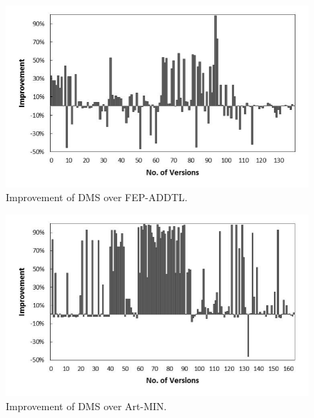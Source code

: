 
\begin{figure}[!htbp]
    \centering
    \includegraphics[width=12cm]{mut-dms-feq.pdf}
\caption{Improvement of D{\scriptsize MS} over F{\scriptsize EP}-A{\scriptsize DDTL}.}
    \label{fig:our_vs_fep}
\end{figure}



\begin{figure}[!htbp]
    \centering
    \includegraphics[width=12cm]{mut-dms-art.pdf}
    \caption{Improvement of D{\scriptsize MS} over A{\scriptsize rt}-M{\scriptsize IN}.}
    \label{fig:our_vs_artmin}
\end{figure}

